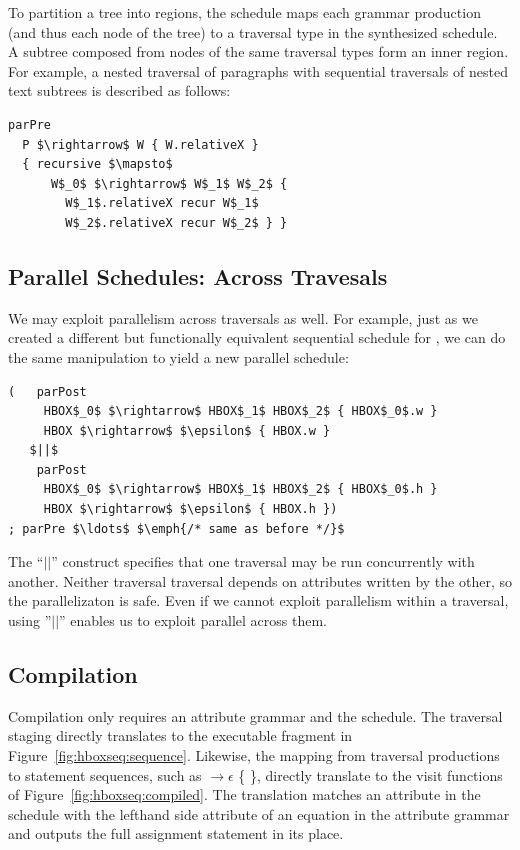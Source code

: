 To partition a tree into regions, the schedule maps each grammar production (and thus each node of the tree) to a traversal type in the synthesized schedule.  A subtree composed from nodes of the same traversal types form an inner region.  For example, a nested traversal of paragraphs with sequential traversals of nested text subtrees is described as follows: 

\begin{lstlisting}[mathescape,morekeywords={parPre,parPost,nested,recursive,recur}]
parPre 
  P $\rightarrow$ W { W.relativeX }
  { recursive $\mapsto$   
      W$_0$ $\rightarrow$ W$_1$ W$_2$ {
        W$_1$.relativeX recur W$_1$ 
        W$_2$.relativeX recur W$_2$ } }
\end{lstlisting}


\subsection{Parallel Schedules: Across Travesals}
We may exploit parallelism across traversals as well. For example, just as we created a different but functionally equivalent sequential schedule for \hlang, we can do the same manipulation to yield a new parallel schedule:
\begin{minipage}{1\columnwidth}
\begin{lstlisting}[mathescape,morekeywords={parPre,parPost}]
(   parPost
     HBOX$_0$ $\rightarrow$ HBOX$_1$ HBOX$_2$ { HBOX$_0$.w }
     HBOX $\rightarrow$ $\epsilon$ { HBOX.w }  
   $||$  
    parPost
     HBOX$_0$ $\rightarrow$ HBOX$_1$ HBOX$_2$ { HBOX$_0$.h }
     HBOX $\rightarrow$ $\epsilon$ { HBOX.h })
; parPre $\ldots$ $\emph{/* same as before */}$
\end{lstlisting}
\end{minipage}
The ``$||$'' construct specifies that one traversal may be run concurrently with another. Neither traversal traversal depends on attributes written by the other, so the parallelizaton is safe. Even if we cannot exploit parallelism within a traversal, using ''$||$'' enables us to exploit parallel across them. 









\subsection{Compilation}
Compilation only requires an attribute grammar and the schedule. The traversal staging  directly translates to the executable fragment in Figure~\ref{fig:hboxseq:sequence}. Likewise, the mapping from traversal productions to statement sequences, such as  $\rightarrow \epsilon$ \{  \}, directly translate to the visit functions of Figure~\ref{fig:hboxseq:compiled}. The translation matches an attribute in the schedule with the lefthand side attribute of an equation in the attribute grammar and outputs the full assignment statement in its place. 


